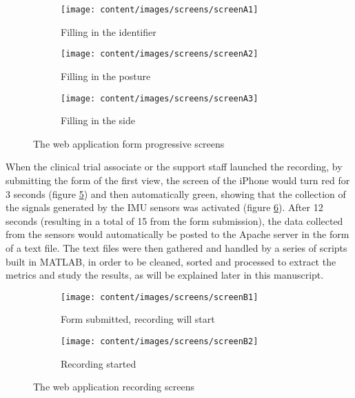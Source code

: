 \begin{figure}[h]
\centering
\begin{subfigure}{.33\textwidth}
  \centering
  \texttt{[image: content/images/screens/screenA1]}
  \caption{Filling in the identifier}
  \label{fig:webAppForm1}
\end{subfigure}%
\begin{subfigure}{.33\textwidth}
  \centering
  \texttt{[image: content/images/screens/screenA2]}
  \caption{Filling in the posture}
  \label{fig:webAppForm2}
\end{subfigure}
\begin{subfigure}{.33\textwidth}
  \centering
  \texttt{[image: content/images/screens/screenA3]}
  \caption{Filling in the side}
  \label{fig:webAppForm3}
\end{subfigure}
\caption{The web application form progressive screens}
\label{fig:webAppForm}
\end{figure}

When the clinical trial associate or the support staff launched the recording, by submitting the form of the first view, the screen of the iPhone would turn red for 3 seconds (figure \ref{fig:webApp1}) and then automatically green, showing that the collection of the signals generated by the \gls{IMU} sensors was activated (figure \ref{fig:webApp2}). After 12 seconds (resulting in a total of 15 from the form submission), the data collected from the sensors would automatically be posted to the Apache server in the form of a text file. The text files were then gathered and handled by a series of scripts built in MATLAB, in order to be cleaned, sorted and processed to extract the metrics and study the results, as will be explained later in this manuscript. 

\begin{figure}[h]
\centering
\begin{subfigure}{.5\textwidth}
  \centering
  \texttt{[image: content/images/screens/screenB1]}
  \caption{Form submitted, recording will start}
  \label{fig:webApp1}
\end{subfigure}%
\begin{subfigure}{.5\textwidth}
  \centering
  \texttt{[image: content/images/screens/screenB2]}
  \caption{Recording started}
  \label{fig:webApp2}
\end{subfigure}
\caption{The web application recording screens}
\label{fig:webApp}
\end{figure}

